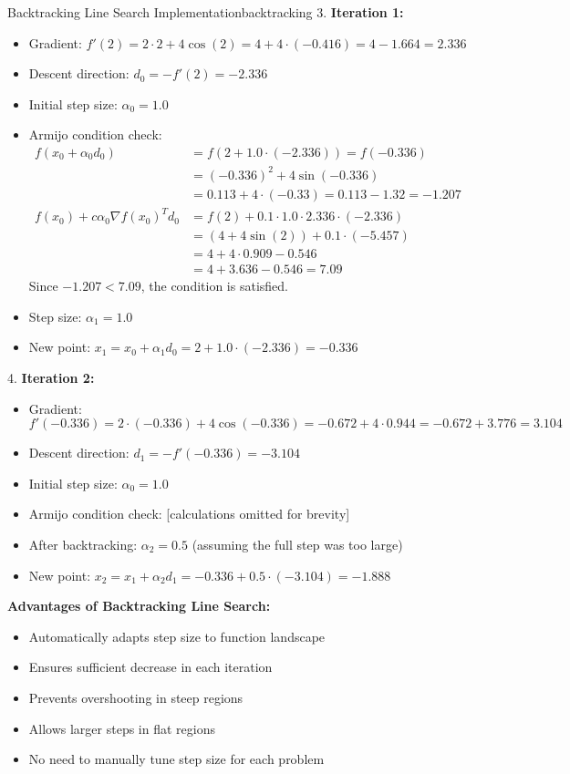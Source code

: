 \documentclass[12pt]{article}
\begin{document}
\begin{example}{Backtracking Line Search Implementation}{backtracking}
3. \textbf{Iteration 1:}
   \begin{itemize}
   \item Gradient: $f'(2) = 2 \cdot 2 + 4\cos(2) = 4 + 4 \cdot (-0.416) = 4 - 1.664 = 2.336$
   \item Descent direction: $d_0 = -f'(2) = -2.336$
   \item Initial step size: $\alpha_0 = 1.0$
   \item Armijo condition check:
     \begin{align}
     f(x_0 + \alpha_0 d_0) &= f(2 + 1.0 \cdot (-2.336)) = f(-0.336) \\
     &= (-0.336)^2 + 4\sin(-0.336) \\
     &= 0.113 + 4 \cdot (-0.33) = 0.113 - 1.32 = -1.207 \\
     f(x_0) + c \alpha_0 \nabla f(x_0)^T d_0 &= f(2) + 0.1 \cdot 1.0 \cdot 2.336 \cdot (-2.336) \\
     &= (4 + 4\sin(2)) + 0.1 \cdot (-5.457) \\
     &= 4 + 4 \cdot 0.909 - 0.546 \\
     &= 4 + 3.636 - 0.546 = 7.09
     \end{align}
     Since $-1.207 < 7.09$, the condition is satisfied.
   \item Step size: $\alpha_1 = 1.0$
   \item New point: $x_1 = x_0 + \alpha_1 d_0 = 2 + 1.0 \cdot (-2.336) = -0.336$
   \end{itemize}

4. \textbf{Iteration 2:}
   \begin{itemize}
   \item Gradient: $f'(-0.336) = 2 \cdot (-0.336) + 4\cos(-0.336) = -0.672 + 4 \cdot 0.944 = -0.672 + 3.776 = 3.104$
   \item Descent direction: $d_1 = -f'(-0.336) = -3.104$
   \item Initial step size: $\alpha_0 = 1.0$
   \item Armijo condition check: [calculations omitted for brevity]
   \item After backtracking: $\alpha_2 = 0.5$ (assuming the full step was too large)
   \item New point: $x_2 = x_1 + \alpha_2 d_1 = -0.336 + 0.5 \cdot (-3.104) = -1.888$
   \end{itemize}

\textbf{Advantages of Backtracking Line Search:}
\begin{itemize}
    \item Automatically adapts step size to function landscape
    \item Ensures sufficient decrease in each iteration
    \item Prevents overshooting in steep regions
    \item Allows larger steps in flat regions
    \item No need to manually tune step size for each problem
\end{itemize}


\end{example}
\end{document}
